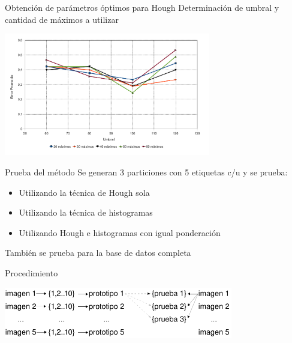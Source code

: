 \documentclass[spanish]{beamer}
\begin{document}
%
\begin{frame}{Obtención de parámetros óptimos para Hough}
  Determinación de umbral y cantidad de máximos a utilizar
  \begin{center}
    \includegraphics[width=9cm]{../diagramas/estadistica_noche_iguales}
  \end{center}
\end{frame}
%
\begin{frame}{Prueba del método}
Se generan 3 particiones con 5 etiquetas c/u y se prueba:
  \begin{itemize}
  \item Utilizando la técnica de Hough sola
  \item Utilizando la técnica de histogramas
  \item Utilizando Hough e histogramas con igual ponderación
  \end{itemize}
También se prueba para la base de datos completa
\end{frame}
%
\begin{frame}{Procedimiento}
  \begin{center}
    \includegraphics[width=10cm]{../diagramas/generacion-prototipos}
  \end{center}
\end{frame}
%
\end{document}
